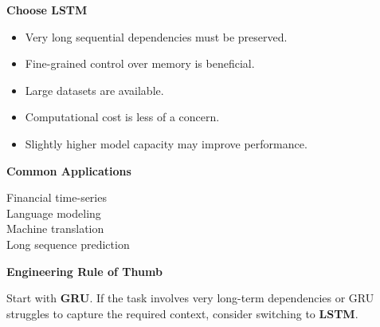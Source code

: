 \documentclass[11pt]{article}
\begin{document}
\begin{minipage}[t]{0.47\textwidth}

{\large\color{brandblue}\textbf{Choose LSTM}}

\vspace{0.05in}

\begin{itemize}[leftmargin=*, itemsep=0.08in,
label={\color{brandblue}\textbullet}]

\item Very long sequential dependencies must be preserved.

\item Fine-grained control over memory is beneficial.

\item Large datasets are available.

\item Computational cost is less of a concern.

\item Slightly higher model capacity may improve performance.

\end{itemize}

\vspace{0.08in}

\textbf{Common Applications}

{\small
Financial time-series\\
Language modeling\\
Machine translation\\
Long sequence prediction
}

\end{minipage}

\vspace{0.2in}

\begin{infobox}

\textbf{Engineering Rule of Thumb}

Start with \textbf{GRU}. If the task involves very long-term
dependencies or GRU struggles to capture the required context,
consider switching to \textbf{LSTM}.

\end{infobox}

\vfill
\newpage


\vspace*{0.35in}
\end{document}
